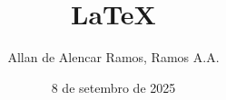 \documentclass[12pt, a4paper]{article}
\begin{document}
\title{LaTeX}

\author{Allan de Alencar Ramos, Ramos A.A.}

\date{8 de setembro de 2025}

\maketitle
\end{document}
